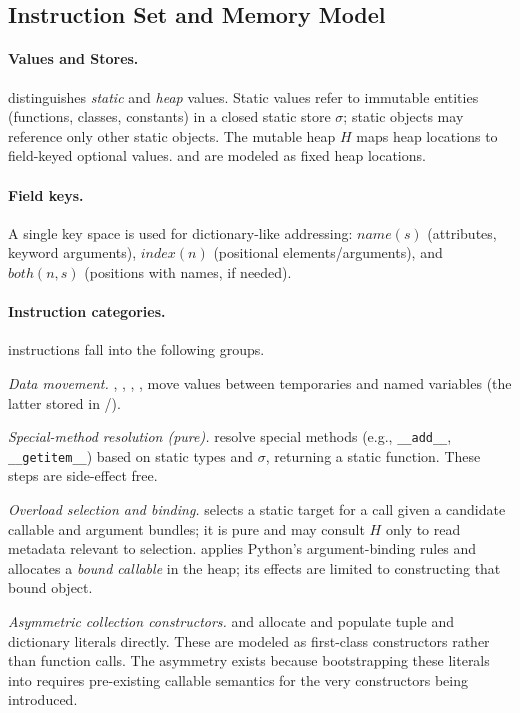 \subsection{Instruction Set and Memory Model}

\paragraph{Values and Stores.}
\spytecode distinguishes \emph{static} and \emph{heap} values. Static values refer to immutable entities (functions, classes, constants) in a closed static store $\sigma$; static objects may reference only other static objects. The mutable heap $H$ maps heap locations to field-keyed optional values. \tLOCALS and \tGLOBALS are modeled as fixed heap locations.

\paragraph{Field keys.}
A single key space is used for dictionary-like addressing:
$\mathit{name}(s)$ (attributes, keyword arguments),
$\mathit{index}(n)$ (positional elements/arguments), and
$\mathit{both}(n,s)$ (positions with names, if needed).

\paragraph{Instruction categories.}
\spytecode instructions fall into the following groups.

\smallskip
\noindent\emph{Data movement.}
\tMov, \tLoadConst, \tLoadLocal, \tLoadGlobal, \tSetLocal move values between temporaries and named variables (the latter stored in \tLOCALS/\tGLOBALS).

\smallskip
\noindent\emph{Special-method resolution (pure).}
\tLookupDunder resolve special methods (e.g., \texttt{\_\_add\_\_}, \texttt{\_\_getitem\_\_}) based on static types and $\sigma$, returning a static function. These steps are side-effect free.

\smallskip
\noindent\emph{Overload selection and binding.}
\tResolveOverload selects a static target for a call given a candidate callable and argument bundles; it is pure and may consult $H$ only to read metadata relevant to selection. \tBind applies Python's argument-binding rules and allocates a \emph{bound callable} in the heap; its effects are limited to constructing that bound object.

\smallskip
\noindent\emph{Asymmetric collection constructors.}
\tConstructTuple and \tConstructDict allocate and populate tuple and dictionary literals directly. These are modeled as first-class constructors rather than function calls. The asymmetry exists because bootstrapping these literals into \tCall requires pre-existing callable semantics for the very constructors being introduced.

